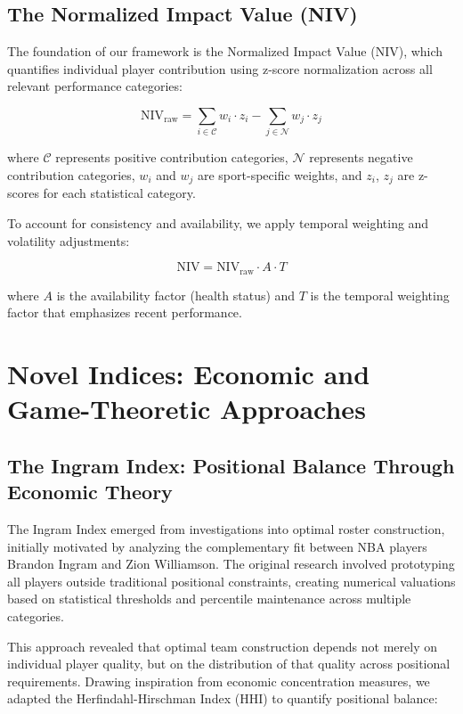 \documentclass[11pt]{article}
\begin{document}
\subsection{The Normalized Impact Value (NIV)}

The foundation of our framework is the Normalized Impact Value (NIV), which quantifies individual player contribution using z-score normalization across all relevant performance categories:

\begin{equation}
\text{NIV}_{\text{raw}} = \sum_{i \in \mathcal{C}} w_i \cdot z_i - \sum_{j \in \mathcal{N}} w_j \cdot z_j
\end{equation}

where $\mathcal{C}$ represents positive contribution categories, $\mathcal{N}$ represents negative contribution categories, $w_i$ and $w_j$ are sport-specific weights, and $z_i$, $z_j$ are z-scores for each statistical category.

To account for consistency and availability, we apply temporal weighting and volatility adjustments:

\begin{equation}
\text{NIV} = \text{NIV}_{\text{raw}} \cdot A \cdot T
\end{equation}

where $A$ is the availability factor (health status) and $T$ is the temporal weighting factor that emphasizes recent performance.

\section{Novel Indices: Economic and Game-Theoretic Approaches}

\subsection{The Ingram Index: Positional Balance Through Economic Theory}

The Ingram Index emerged from investigations into optimal roster construction, initially motivated by analyzing the complementary fit between NBA players Brandon Ingram and Zion Williamson. The original research involved prototyping all players outside traditional positional constraints, creating numerical valuations based on statistical thresholds and percentile maintenance across multiple categories.

This approach revealed that optimal team construction depends not merely on individual player quality, but on the distribution of that quality across positional requirements. Drawing inspiration from economic concentration measures, we adapted the Herfindahl-Hirschman Index (HHI) to quantify positional balance:
\end{document}
